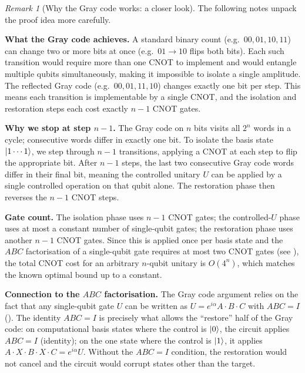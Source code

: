 \documentclass[12pt, a4paper, oneside]{report}
\theoremstyle{plain}
\theoremstyle{definition}
\theoremstyle{remark}
\newtheorem{remark}[theorem]{Remark}
\begin{document}
\begin{remark}[Why the Gray code works: a closer look]
The following notes unpack the proof idea more carefully.

\textbf{What the Gray code achieves.}
A standard binary count (e.g.\ $00, 01, 10, 11$) can change two or more bits at once
(e.g.\ $01 \to 10$ flips both bits). Each such transition would require more than one CNOT
to implement and would entangle multiple qubits simultaneously, making it impossible to
isolate a single amplitude. The reflected Gray code (e.g.\ $00, 01, 11, 10$) changes
exactly one bit per step. This means each transition is implementable by a single CNOT,
and the isolation and restoration steps each cost exactly $n-1$ CNOT gates.

\textbf{Why we stop at step $n-1$.}
The Gray code on $n$ bits visits all $2^n$ words in a cycle; consecutive words differ in
exactly one bit. To isolate the basis state $\ket{1\cdots1}$, we step through $n-1$
transitions, applying a CNOT at each step to flip the appropriate bit. After $n-1$ steps,
the last two consecutive Gray code words differ in their final bit, meaning the controlled
unitary $U$ can be applied by a single controlled operation on that qubit alone. The
restoration phase then reverses the $n-1$ CNOT steps.

\textbf{Gate count.}
The isolation phase uses $n-1$ CNOT gates; the controlled-$U$ phase uses at most a constant
number of single-qubit gates; the restoration phase uses another $n-1$ CNOT gates. Since
this is applied once per basis state and the $ABC$ factorisation of a single-qubit gate
requires at most two CNOT gates (see ), the total CNOT cost for an arbitrary
$n$-qubit unitary is $O(4^n)$, which matches the known optimal bound up to a constant.

\textbf{Connection to the $ABC$ factorisation.}
The Gray code argument relies on the fact that any single-qubit gate $U$ can be written as
$U = e^{i\alpha} A \cdot B \cdot C$ with $ABC = I$ (). The identity
$ABC = I$ is precisely what allows the ``restore'' half of the Gray code: on computational
basis states where the control is $\ket{0}$, the circuit applies $ABC = I$ (identity); on
the one state where the control is $\ket{1}$, it applies
$A \cdot X \cdot B \cdot X \cdot C = e^{i\alpha} U$. Without the $ABC = I$ condition, the
restoration would not cancel and the circuit would corrupt states other than the target.
\end{remark}


\end{document}
